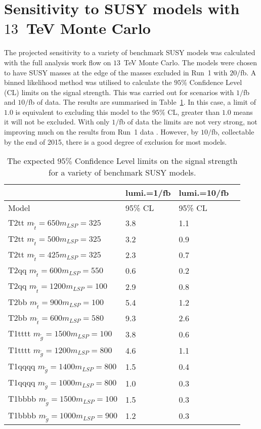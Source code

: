 
\section{Sensitivity to SUSY models with \boldmath $13$~TeV Monte Carlo}
\label{sec:phys14Results}

The projected sensitivity to a variety of benchmark SUSY models was calculated with the full analysis work flow on $13$~TeV Monte Carlo. The models were chosen to have SUSY masses at the edge of the masses excluded in Run~1 with $20/$fb. A binned likelihood method was utilised to calculate the $95\%$ Confidence Level (CL) limits on the signal strength. This was carried out for scenarios with $1/$fb and $10/$fb of data. The results are summarised in Table~\ref{tab:results}. In this case, a limit of $1.0$ is equivalent to excluding this model to the $95\%$ CL, greater than $1.0$ means it will not be excluded. With only $1/$fb of data the limits are not very strong, not improving much on the results from Run~1 data \cite{susyRun1Twiki}. However, by $10/$fb, collectable by the end of 2015, there is a good degree of exclusion for most models.
 
\begin{table}[h]
\caption{The expected $95\%$ Confidence Level limits on the signal strength for a variety of benchmark SUSY models. \label{tab:results}}
\centering 
\begin{tabular}{ | l | l | l | }
\hline
	&lumi.=1/fb & lumi.=10/fb  \  \\ \hline
	Model & 95\% CL & 95\% CL \\ \hline
	T2tt $m_{\tilde{t}}=650 m_{LSP}=325$ & 3.8 & 1.1 \\ 
	T2tt $m_{\tilde{t}}=500 m_{LSP}=325$ & 3.2 & 0.9 \\ 
	T2tt $m_{\tilde{t}}=425 m_{LSP}=325$ & 2.3 & 0.7 \\ 
	T2qq $m_{\tilde{t}}=600 m_{LSP}=550$ & 0.6 & 0.2 \\ 
	T2qq $m_{\tilde{t}}=1200 m_{LSP}=100$ & 2.9 & 0.8 \\ 
	T2bb $m_{\tilde{t}}=900 m_{LSP}=100$ & 5.4 & 1.2 \\ 
	T2bb $m_{\tilde{t}}=600 m_{LSP}=580$ & 9.3 & 2.6 \\ 
	T1tttt $m_{\tilde{g}}=1500 m_{LSP}=100$ & 3.8 & 0.6 \\ 
	T1tttt $m_{\tilde{g}}=1200 m_{LSP}=800$ & 4.6 & 1.1 \\ 
	T1qqqq $m_{\tilde{g}}=1400 m_{LSP}=800$ & 1.5 & 0.4 \\ 
	T1qqqq $m_{\tilde{g}}=1000 m_{LSP}=800$ & 1.0 & 0.3 \\ 
	T1bbbb $m_{\tilde{g}}=1500 m_{LSP}=100$ & 1.5 & 0.3 \\ 
	T1bbbb $m_{\tilde{g}}=1000 m_{LSP}=900$ & 1.2 & 0.3 \\ \hline
\end{tabular}
\end{table}